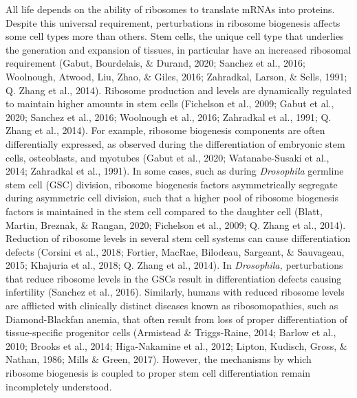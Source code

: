 \documentclass[12pt,oneside]{reedthesis}
\begin{document}
All life depends on the ability of ribosomes to translate mRNAs into proteins. Despite this universal requirement, perturbations in ribosome biogenesis affects some cell types more than others. Stem cells, the unique cell type that underlies the generation and expansion of tissues, in particular have an increased ribosomal requirement (Gabut, Bourdelais, \& Durand, 2020; Sanchez et al., 2016; Woolnough, Atwood, Liu, Zhao, \& Giles, 2016; Zahradkal, Larson, \& Sells, 1991; Q. Zhang et al., 2014). Ribosome production and levels are dynamically regulated to maintain higher amounts in stem cells (Fichelson et al., 2009; Gabut et al., 2020; Sanchez et al., 2016; Woolnough et al., 2016; Zahradkal et al., 1991; Q. Zhang et al., 2014). For example, ribosome biogenesis components are often differentially expressed, as observed during the differentiation of embryonic stem cells, osteoblasts, and myotubes (Gabut et al., 2020; Watanabe-Susaki et al., 2014; Zahradkal et al., 1991). In some cases, such as during \emph{Drosophila} germline stem cell (GSC) division, ribosome biogenesis factors asymmetrically segregate during asymmetric cell division, such that a higher pool of ribosome biogenesis factors is maintained in the stem cell compared to the daughter cell (Blatt, Martin, Breznak, \& Rangan, 2020; Fichelson et al., 2009; Q. Zhang et al., 2014). Reduction of ribosome levels in several stem cell systems can cause differentiation defects (Corsini et al., 2018; Fortier, MacRae, Bilodeau, Sargeant, \& Sauvageau, 2015; Khajuria et al., 2018; Q. Zhang et al., 2014). In \emph{Drosophila,} perturbations that reduce ribosome levels in the GSCs result in differentiation defects causing infertility (Sanchez et al., 2016). Similarly, humans with reduced ribosome levels are afflicted with clinically distinct diseases known as ribosomopathies, such as Diamond-Blackfan anemia, that often result from loss of proper differentiation of tissue-specific progenitor cells (Armistead \& Triggs-Raine, 2014; Barlow et al., 2010; Brooks et al., 2014; Higa-Nakamine et al., 2012; Lipton, Kudisch, Gross, \& Nathan, 1986; Mills \& Green, 2017). However, the mechanisms by which ribosome biogenesis is coupled to proper stem cell differentiation remain incompletely understood.
\end{document}
